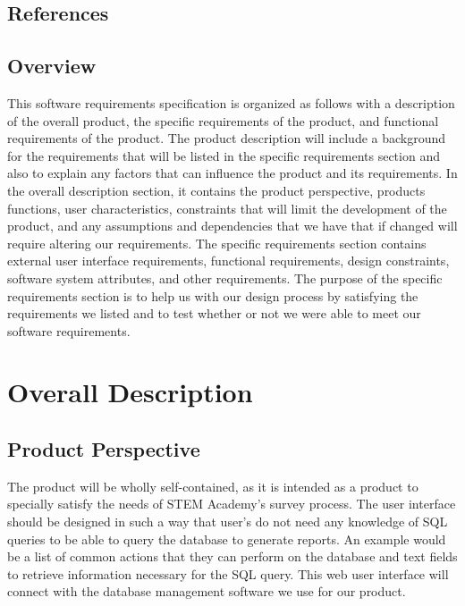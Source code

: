 \documentclass[letterpaper,10pt,titlepage, draftclsnofoot,onecolumn]{IEEEtran}
\begin{document}
\subsection{References}
\subsection{Overview}
This software requirements specification is organized as follows with a description of the overall product, the specific requirements of the product, and functional requirements of the product.
The product description will include a background for the requirements that will be listed in the specific requirements section and also to explain any factors that can influence the product and its requirements. 
In the overall description section, it contains the product perspective, products functions, user characteristics, constraints that will limit the development of the product, and any assumptions and dependencies that we have that if changed will require altering our requirements. 
The specific requirements section contains external user interface requirements, functional requirements, design constraints, software system attributes, and other requirements. 
The purpose of the specific requirements section is to help us with our design process by satisfying the requirements we listed and to test whether or not we were able to meet our software requirements. 
\section{Overall Description}

\subsection{Product Perspective}
The product will be wholly self-contained, as it is intended as a product to specially satisfy the needs of STEM Academy's survey process.
The user interface should be designed in such a way that user's do not need any knowledge of SQL queries to be able to query the database to generate reports.
An example would be a list of common actions that they can perform on the database and text fields to retrieve information necessary for the SQL query.
This web user interface will connect with the database management software we use for our product.
\end{document}
